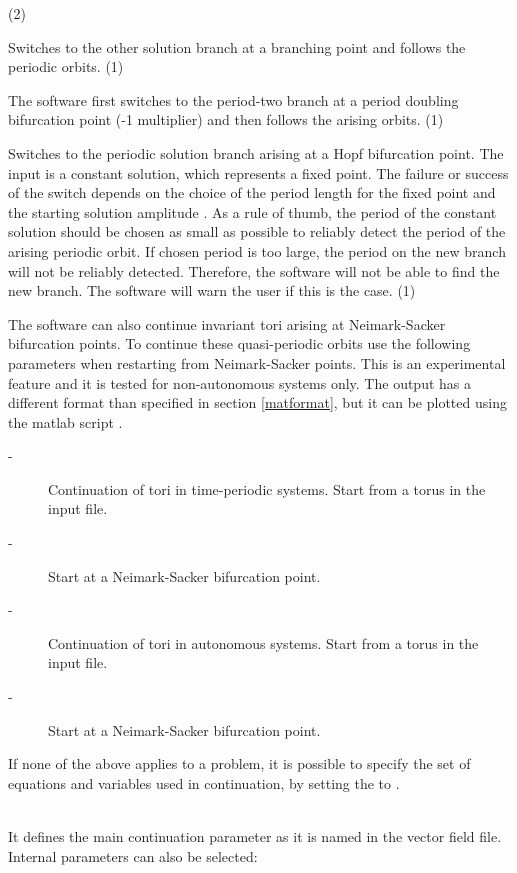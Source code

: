\documentclass[10pt,a4paper]{ddedoc}
\begin{document}
\begin{description}
\begin{description}
(2)
%
\item[\funp{DDE\_AUT\_BP\_SW} -] Switches to the other solution branch at a branching point and
follows the periodic orbits. (1)
%
\item[\funp{DDE\_AUT\_PD\_SW} -] The software first switches to the period-two branch at a
period doubling bifurcation point
(-1 multiplier) and then follows the arising orbits. (1)
%
\item[\funp{DDE\_AUT\_HOPF\_SW} -] Switches to the periodic solution branch arising at a Hopf
bifurcation point. The input is a constant solution, which represents a fixed
point. The failure or success of the switch depends on the choice of the period
length for the fixed point and the starting solution amplitude .
As a rule of thumb, the period of the constant solution should be chosen as
small as possible to reliably detect the period of the arising periodic orbit.
If chosen period is too large, the period on the new branch will not be reliably detected. 
Therefore, the software will not be able to find the new branch. The software will warn 
the user if this is the case. (1)
\end{description}
The software can also continue invariant tori arising at Neimark-Sacker
bifurcation points. To continue these quasi-periodic orbits use the following
parameters when restarting from Neimark-Sacker points. This is an experimental
feature and  it is tested for non-autonomous systems only. The output has a different format
than specified in section \ref{matformat}, but it can be plotted using the matlab script 
.
\begin{description}
\item[ -] Continuation of tori in time-periodic systems. Start from a torus in the input file.
\item[ -] Start at a Neimark-Sacker bifurcation point.
%
\item[ -] Continuation of tori in autonomous systems. Start from a torus in the input file.
\item[ -] Start at a Neimark-Sacker bifurcation point.
\end{description}
If none of the above applies to a problem, it is possible to specify the set of
equations and variables used in continuation, by setting the  to
.
%
\item[\funp{cp}] ~\\
It defines the main continuation parameter as it is named in the vector field file. Internal parameters can also be selected:

\end{description}
\end{document}
